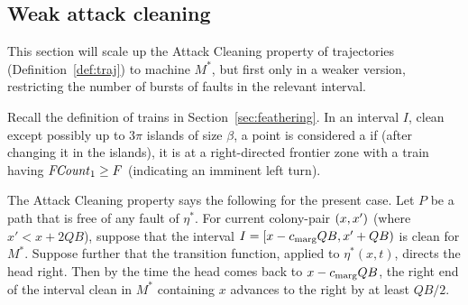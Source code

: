 \documentclass[11pt]{memoir}
\theoremstyle{definition} %
\renewcommand{\ge}{\geq}
\newcommand{\fld}[1]{\ensuremath{\textit{#1\/}}}
\def\B{B}
\newcommand{\F}{F}
\newcommand{\passno}{\pi}
\newcommand{\Q}{Q} %
\newcommand{\FCount}{\fld{FCount}} %
\newcommand{\cns}[1]{c_{\textrm{\upshape #1}}}
\newcommand{\CMarg}{\cns{marg}}
\begin{document}
\subsection{Weak attack cleaning}

This section will scale up the Attack Cleaning
property of trajectories (Definition~\ref{def:traj})
to machine \( M^{*} \), but first only in 
a weaker version, restricting the number of bursts of faults in the relevant interval.

\begin{definition}[Trap]\label{def:trap}
  Recall the definition of trains in Section~\ref{sec:feathering}.
In an interval \( I \), clean except possibly up to \( 3\passno \) islands of size \( \beta \),
a point is considered a  if (after changing it in the islands),
it is at a right-directed frontier zone with a train having \( \FCount_{1}\ge\F \)
(indicating an imminent left turn).
\end{definition}

The Attack Cleaning property says the following for the present case.
Let \( P \) be a path that is free of any fault of \( \eta^{*} \).
For current colony-pair \( (x,x') \) (where \( x'< x+2\Q\B \)), suppose that the interval
\( I=\lint{x-\CMarg\Q\B}{x'+\Q\B} \) is clean for \( M^{*} \).
Suppose further that the transition function, applied to \( \eta^{*}(x,t) \), directs the head right.
Then by the time the head comes back to \( x-\CMarg\Q\B \),
the right end of the interval clean in \( M^{*} \)
containing \( x \) advances to the right by at least \( \Q\B /2\).
\end{document}
